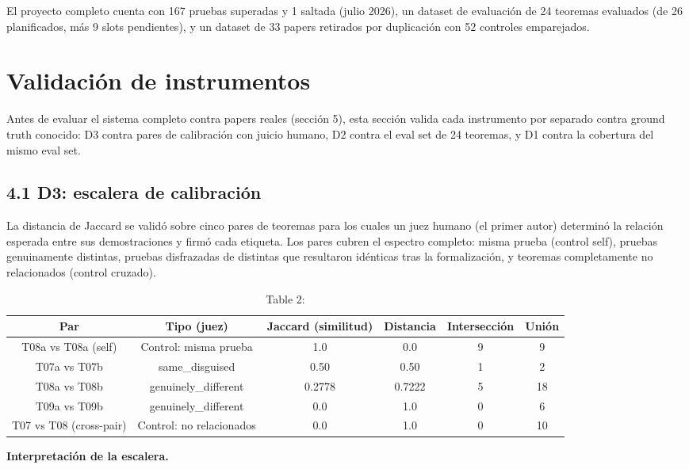 \documentclass[12pt,a4paper]{article}
\theoremstyle{remark}
\begin{document}
El proyecto completo cuenta con 167 pruebas superadas y 1 saltada (julio 2026), un dataset de evaluación de 24 teoremas evaluados (de 26 planificados, más 9 slots pendientes), y un dataset de 33 papers retirados por duplicación con 52 controles emparejados.


\section{Validación de instrumentos}

Antes de evaluar el sistema completo contra papers reales (sección 5), esta sección valida cada instrumento por separado contra ground truth conocido: D3 contra pares de calibración con juicio humano, D2 contra el eval set de 24 teoremas, y D1 contra la cobertura del mismo eval set.


\subsection{4.1 D3: escalera de calibración}

La distancia de Jaccard se validó sobre cinco pares de teoremas para los cuales un juez humano (el primer autor) determinó la relación esperada entre sus demostraciones y firmó cada etiqueta. Los pares cubren el espectro completo: misma prueba (control self), pruebas genuinamente distintas, pruebas disfrazadas de distintas que resultaron idénticas tras la formalización, y teoremas completamente no relacionados (control cruzado).


\begin{table}[htbp]
\centering
\begin{tabular}{|c|c|c|c|c|c|}
\hline
Par & Tipo (juez) & Jaccard (similitud) & Distancia & Intersección & Unión \\
\hline
T08a vs T08a (self) & Control: misma prueba & 1.0 & 0.0 & 9 & 9 \\
T07a vs T07b & same\_disguised & 0.50 & 0.50 & 1 & 2 \\
T08a vs T08b & genuinely\_different & 0.2778 & 0.7222 & 5 & 18 \\
T09a vs T09b & genuinely\_different & 0.0 & 1.0 & 0 & 6 \\
T07 vs T08 (cross-pair) & Control: no relacionados & 0.0 & 1.0 & 0 & 10 \\
\hline
\end{tabular}
\caption{Table 2: }
\label{tab:2}
\end{table}


\textbf{Interpretación de la escalera.}
\end{document}
